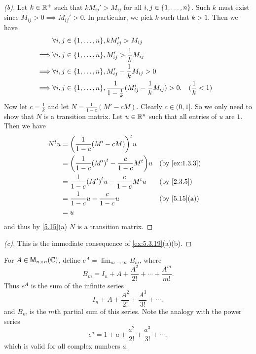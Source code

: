 \begin{proof}[(b)]
	Let \(k \in \mathbb{R}^+\) such that \(k M_{i j}' > M_{i j}\) for all \(i, j \in \left\lbrace1, \dots, n\right\rbrace\).
	Such \(k\) must exist since \(M_{i j} > 0 \implies M_{i j}' > 0\).
	In particular, we pick \(k\) such that \(k > 1\).
	Then we have
	\begin{align*}
		         & \forall i, j \in \set{1, \dots, n}, k M_{i j}' > M_{i j}                                                                   \\
		\implies & \forall i, j \in \set{1, \dots, n}, M_{i j}' > \frac{1}{k} M_{i j}                                                         \\
		\implies & \forall i, j \in \set{1, \dots, n}, M_{i j}' - \frac{1}{k} M_{i j} > 0                                                     \\
		\implies & \forall i, j \in \set{1, \dots, n}, \frac{1}{1 - \frac{1}{k}} (M_{i j}' - \frac{1}{k} M_{i j}) > 0. &  & (\frac{1}{k} < 1)
	\end{align*}
	Now let \(c = \frac{1}{k}\) and let \(N = \frac{1}{1 - c} (M' - cM)\).
	Clearly \(c \in (0, 1]\).
	So we only need to show that \(N\) is a transition matrix.
	Let \(u \in \mathbb{R}^n\) such that all entries of \(u\) are \(1\).
	Then we have
	\begin{align*}
		\tp{N} u & = \tp{\pa{\frac{1}{1 - c} (M' - cM)}} u                                        \\
		         & = \pa{\frac{1}{1 - c} \tp{(M')} - \frac{c}{1 - c} \tp{M}} u &  & \by{ex:1.3.3} \\
		         & = \frac{1}{1 - c} \tp{(M')} u - \frac{c}{1 - c} \tp{M} u    &  & \by{2.3.5}    \\
		         & = \frac{1}{1 - c} u - \frac{c}{1 - c} u                     &  & \by{5.15}[a]  \\
		         & = u
	\end{align*}
	and thus by \cref{5.15}(a) \(N\) is a transition matrix.
\end{proof}

\begin{proof}[(c)]
	This is the immediate consequence of \cref{ex:5.3.19}(a)(b).
\end{proof}

\begin{defn}\label{5.3.18}
	For \(A \in \mathsf{M}_{{n} \times n}({\mathbb{C}})\), define \(e^A = \lim_{m \to \infty} B_m\), where
	\[
		B_m = I_n + A + \frac{A^2}{2!} + \cdots + \frac{A^m}{m!}.
	\]
	Thus \(e^A\) is the sum of the infinite series
	\[
		I_n + A + \frac{A^2}{2!} + \frac{A^3}{3!} + \cdots,
	\]
	and \(B_m\) is the \(m\)th partial sum of this series.
	Note the analogy with the power series
	\[
		e^a = 1 + a + \frac{a^2}{2!} + \frac{a^3}{3!} + \cdots,
	\]
	which is valid for all complex numbers \(a\).
\end{defn}

